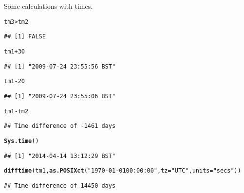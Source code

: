 \documentclass[12pt, a4paper, oneside]{article}\usepackage[]{graphicx}\usepackage[]{color}
\makeatletter
\newcommand{\hlnum}[1]{\textcolor[rgb]{0.686,0.059,0.569}{#1}}%
\newcommand{\hlstr}[1]{\textcolor[rgb]{0.192,0.494,0.8}{#1}}%
\newcommand{\hlopt}[1]{\textcolor[rgb]{0,0,0}{#1}}%
\newcommand{\hlstd}[1]{\textcolor[rgb]{0.345,0.345,0.345}{#1}}%
\newcommand{\hlkwc}[1]{\textcolor[rgb]{0.333,0.667,0.333}{#1}}%
\newcommand{\hlkwd}[1]{\textcolor[rgb]{0.737,0.353,0.396}{\textbf{#1}}}%
\newenvironment{kframe}{%
 \def\at@end@of@kframe{}%
 \ifinner\ifhmode%
  \def\at@end@of@kframe{\end{minipage}}%
  \begin{minipage}{\columnwidth}%
 \fi\fi%
 \def\FrameCommand##1{\hskip\@totalleftmargin \hskip-\fboxsep
 \colorbox{shadecolor}{##1}\hskip-\fboxsep
     \hskip-\linewidth \hskip-\@totalleftmargin \hskip\columnwidth}%
 \MakeFramed {\advance\hsize-\width
   \@totalleftmargin\z@ \linewidth\hsize
   \@setminipage}}%
 {\par\unskip\endMakeFramed%
 \at@end@of@kframe}
\newenvironment{knitrout}{}{} %
\makeatother
\begin{document}
Some calculations with times. 
\begin{knitrout}
\color{fgcolor}\begin{kframe}
\begin{alltt}
\hlstd{tm3} \hlopt{>} \hlstd{tm2}
\end{alltt}
\begin{verbatim}
## [1] FALSE
\end{verbatim}
\begin{alltt}
\hlstd{tm1} \hlopt{+} \hlnum{30}
\end{alltt}
\begin{verbatim}
## [1] "2009-07-24 23:55:56 BST"
\end{verbatim}
\begin{alltt}
\hlstd{tm1} \hlopt{-} \hlnum{20}
\end{alltt}
\begin{verbatim}
## [1] "2009-07-24 23:55:06 BST"
\end{verbatim}
\begin{alltt}
\hlstd{tm1} \hlopt{-} \hlstd{tm2}
\end{alltt}
\begin{verbatim}
## Time difference of -1461 days
\end{verbatim}
\begin{alltt}
\hlkwd{Sys.time}\hlstd{()}
\end{alltt}
\begin{verbatim}
## [1] "2014-04-14 13:12:29 BST"
\end{verbatim}
\begin{alltt}
\hlkwd{difftime}\hlstd{(tm1,} \hlkwd{as.POSIXct}\hlstd{(}\hlstr{"1970-01-01 00:00:00"}\hlstd{,} \hlkwc{tz} \hlstd{=} \hlstr{"UTC"}\hlstd{,} \hlkwc{units} \hlstd{=} \hlstr{"secs"}\hlstd{))}
\end{alltt}
\begin{verbatim}
## Time difference of 14450 days
\end{verbatim}
\end{kframe}
\end{knitrout}
\end{document}
